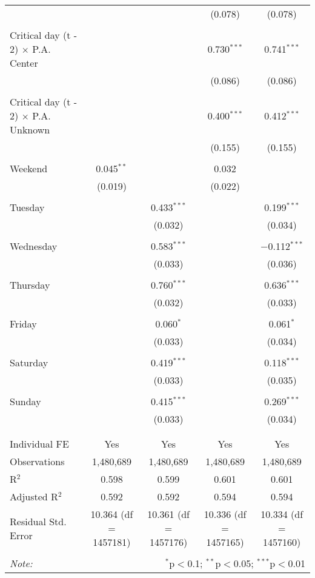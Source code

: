 \documentclass[
]{article}
\begin{document}
\begin{table}[!htbp]
{\begin{tabular}{@{\extracolsep{5pt}}lcccc}
  &  &  & (0.078) & (0.078) \\ 
  & & & & \\ 
 Critical day (t - 2) $\times$ P.A. Center &  &  & 0.730$^{***}$ & 0.741$^{***}$ \\ 
  &  &  & (0.086) & (0.086) \\ 
  & & & & \\ 
 Critical day (t - 2) $\times$ P.A. Unknown &  &  & 0.400$^{***}$ & 0.412$^{***}$ \\ 
  &  &  & (0.155) & (0.155) \\ 
  & & & & \\ 
 Weekend & 0.045$^{**}$ &  & 0.032 &  \\ 
  & (0.019) &  & (0.022) &  \\ 
  & & & & \\ 
 Tuesday &  & 0.433$^{***}$ &  & 0.199$^{***}$ \\ 
  &  & (0.032) &  & (0.034) \\ 
  & & & & \\ 
 Wednesday &  & 0.583$^{***}$ &  & $-$0.112$^{***}$ \\ 
  &  & (0.033) &  & (0.036) \\ 
  & & & & \\ 
 Thursday &  & 0.760$^{***}$ &  & 0.636$^{***}$ \\ 
  &  & (0.032) &  & (0.033) \\ 
  & & & & \\ 
 Friday &  & 0.060$^{*}$ &  & 0.061$^{*}$ \\ 
  &  & (0.033) &  & (0.034) \\ 
  & & & & \\ 
 Saturday &  & 0.419$^{***}$ &  & 0.118$^{***}$ \\ 
  &  & (0.033) &  & (0.035) \\ 
  & & & & \\ 
 Sunday &  & 0.415$^{***}$ &  & 0.269$^{***}$ \\ 
  &  & (0.033) &  & (0.034) \\ 
  & & & & \\ 
\hline \\[-1.8ex] 
Individual FE & Yes & Yes & Yes & Yes \\ 
Observations & 1,480,689 & 1,480,689 & 1,480,689 & 1,480,689 \\ 
R$^{2}$ & 0.598 & 0.599 & 0.601 & 0.601 \\ 
Adjusted R$^{2}$ & 0.592 & 0.592 & 0.594 & 0.594 \\ 
Residual Std. Error & 10.364 (df = 1457181) & 10.361 (df = 1457176) & 10.336 (df = 1457165) & 10.334 (df = 1457160) \\ 
\hline 
\hline \\[-1.8ex] 
\textit{Note:}  & \multicolumn{4}{r}{$^{*}$p$<$0.1; $^{**}$p$<$0.05; $^{***}$p$<$0.01} \\ 
\end{tabular}
} 
\end{table} 
\newpage
\end{document}
